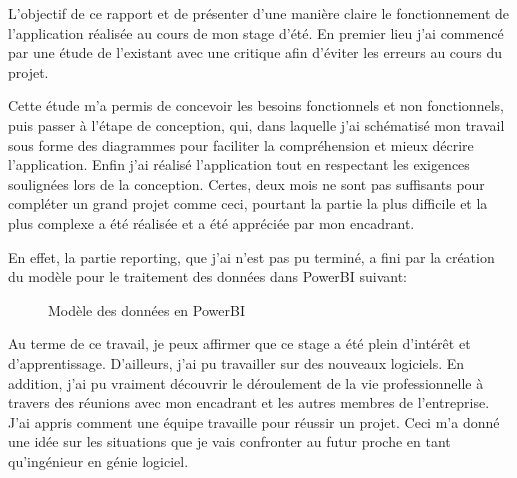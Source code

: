 L’objectif de ce rapport et de présenter d’une manière claire le fonctionnement de l'application
réalisée au cours de mon stage d’été. En premier lieu j'ai commencé par
une étude de l’existant avec une critique afin d'éviter les erreurs au cours du
projet.

Cette étude m'a permis de concevoir les besoins fonctionnels et non fonctionnels, puis passer
à l’étape de conception, qui, dans laquelle j'ai schématisé mon travail sous forme des diagrammes pour faciliter la compréhension et mieux décrire l'application.
Enfin j'ai réalisé l'application tout en respectant les exigences soulignées lors de
la conception. Certes, deux mois ne sont pas suffisants pour compléter un grand projet comme ceci, pourtant la partie la plus difficile et la plus complexe a été réalisée et a été appréciée par mon encadrant.

En effet, la partie reporting, que j’ai n’est pas pu terminé, a fini par la création du modèle pour le traitement des données dans PowerBI suivant:
\begin{figure}[H]
    \begin{center}
        \caption{Modèle des données en PowerBI }
    \end{center}
\end{figure}

Au terme de ce travail, je peux affirmer que ce stage a été plein d’intérêt et d'apprentissage. D'ailleurs, j'ai pu travailler sur des nouveaux logiciels.
En addition, j'ai pu vraiment découvrir le déroulement de la vie professionnelle à travers des réunions avec mon encadrant et les autres membres de l’entreprise.
J'ai appris comment une équipe travaille pour réussir un projet. Ceci m'a donné une idée sur les situations que je vais confronter au futur proche en tant qu'ingénieur en génie logiciel.
